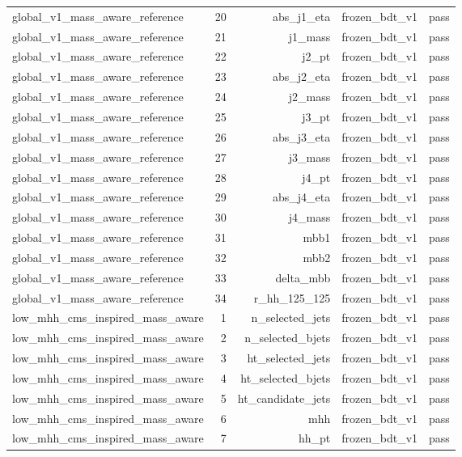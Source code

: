 \begin{table}[htbp]
\begin{tabular}{lrrrr}
global\_v1\_mass\_aware\_reference & 20 & abs\_j1\_eta & frozen\_bdt\_v1 & pass \\
global\_v1\_mass\_aware\_reference & 21 & j1\_mass & frozen\_bdt\_v1 & pass \\
global\_v1\_mass\_aware\_reference & 22 & j2\_pt & frozen\_bdt\_v1 & pass \\
global\_v1\_mass\_aware\_reference & 23 & abs\_j2\_eta & frozen\_bdt\_v1 & pass \\
global\_v1\_mass\_aware\_reference & 24 & j2\_mass & frozen\_bdt\_v1 & pass \\
global\_v1\_mass\_aware\_reference & 25 & j3\_pt & frozen\_bdt\_v1 & pass \\
global\_v1\_mass\_aware\_reference & 26 & abs\_j3\_eta & frozen\_bdt\_v1 & pass \\
global\_v1\_mass\_aware\_reference & 27 & j3\_mass & frozen\_bdt\_v1 & pass \\
global\_v1\_mass\_aware\_reference & 28 & j4\_pt & frozen\_bdt\_v1 & pass \\
global\_v1\_mass\_aware\_reference & 29 & abs\_j4\_eta & frozen\_bdt\_v1 & pass \\
global\_v1\_mass\_aware\_reference & 30 & j4\_mass & frozen\_bdt\_v1 & pass \\
global\_v1\_mass\_aware\_reference & 31 & mbb1 & frozen\_bdt\_v1 & pass \\
global\_v1\_mass\_aware\_reference & 32 & mbb2 & frozen\_bdt\_v1 & pass \\
global\_v1\_mass\_aware\_reference & 33 & delta\_mbb & frozen\_bdt\_v1 & pass \\
global\_v1\_mass\_aware\_reference & 34 & r\_hh\_125\_125 & frozen\_bdt\_v1 & pass \\
low\_mhh\_cms\_inspired\_mass\_aware & 1 & n\_selected\_jets & frozen\_bdt\_v1 & pass \\
low\_mhh\_cms\_inspired\_mass\_aware & 2 & n\_selected\_bjets & frozen\_bdt\_v1 & pass \\
low\_mhh\_cms\_inspired\_mass\_aware & 3 & ht\_selected\_jets & frozen\_bdt\_v1 & pass \\
low\_mhh\_cms\_inspired\_mass\_aware & 4 & ht\_selected\_bjets & frozen\_bdt\_v1 & pass \\
low\_mhh\_cms\_inspired\_mass\_aware & 5 & ht\_candidate\_jets & frozen\_bdt\_v1 & pass \\
low\_mhh\_cms\_inspired\_mass\_aware & 6 & mhh & frozen\_bdt\_v1 & pass \\
low\_mhh\_cms\_inspired\_mass\_aware & 7 & hh\_pt & frozen\_bdt\_v1 & pass \\

\end{tabular}
\end{table}
